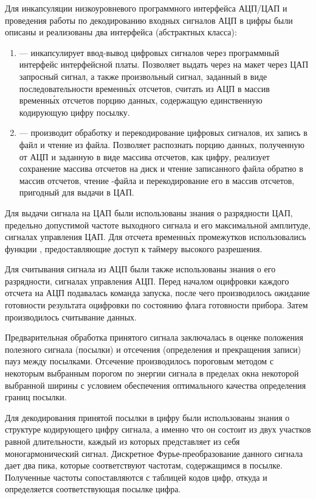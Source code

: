 Для инкапсуляции низкоуровневого программного интерфейса АЦП/ЦАП и проведения работы по декодированию входных сигналов АЦП в цифры были описаны и реализованы два интерфейса (абстрактных класса):
%
\begin{enumerate}
	\item {} --- инкапсулирует ввод-вывод цифровых сигналов через программный интерфейс интерфейсной платы. Позволяет выдать через на макет через ЦАП запросный сигнал, а также произвольный сигнал, заданный в виде последовательности временн\'{ы}х отсчетов, считать из АЦП в массив временн\'{ы}х отсчетов порцию данных, содержащую единственную кодирующую цифру посылку.
	\item {} --- производит обработку и перекодирование цифровых сигналов, их запись в файл и чтение из файла. Позволяет распознать порцию данных, полученную от АЦП и заданную в виде массива отсчетов, как цифру, реализует сохранение массива отсчетов на диск и чтение записанного файла обратно в массив отсчетов, чтение -файла и перекодирование его в массив отсчетов, пригодный для выдачи в ЦАП.
\end{enumerate}

Для выдачи сигнала на ЦАП были использованы знания о разрядности ЦАП, предельно допустимой частоте выходного сигнала и его максимальной амплитуде, сигналах управления ЦАП. Для отсчета временн\'{ы}х промежутков использовались функции , предоставляющие доступ к таймеру высокого разрешения.

Для считывания сигнала из АЦП были также использованы знания о его разрядности, сигналах управления АЦП. Перед началом оцифровки каждого отсчета на АЦП подавалась команда запуска, после чего производилось ожидание готовности результата оцифровки по состоянию флага готовности прибора. Затем производилось считывание данных.

Предварительная обработка принятого сигнала заключалась в оценке положения полезного сигнала (посылки) и отсечения (определения и прекращения записи) пауз между посылками. Отсечение производилось пороговым методом с некоторым выбранным порогом по энергии сигнала в пределах окна некоторой выбранной ширины с условием обеспечения оптимального качества определения границ посылки.

Для декодирования принятой посылки в цифру были использованы знания о структуре кодирующего цифру сигнала, а именно что он состоит из двух участков равной длительности, каждый из которых представляет из себя моногармонический сигнал. Дискретное Фурье-преобразование данного сигнала дает два пика, которые соответствуют частотам, содержащимся в посылке. Полученные частоты сопоставляются с таблицей кодов цифр, откуда и определяется соответствующая посылке цифра.

